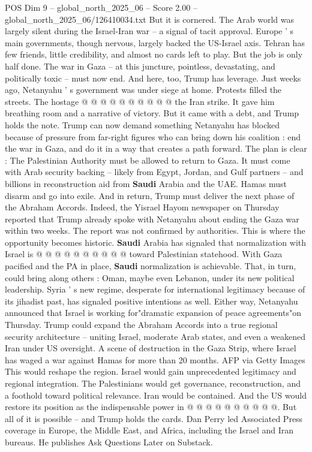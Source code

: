 \begin{textsample}{POS Dim 9 – global\_north\_2025\_06 – Score 2.00 – global\_north\_2025\_06/126410034.txt}
But it is cornered.
The Arab world was largely silent during the Israel-Iran war -- a signal of tacit approval.
Europe ' s main governments, though nervous, largely backed the US-Israel axis.
Tehran has few friends, little credibility, and almost no cards left to play.
But the job is only half done.
The war in Gaza -- at this juncture, pointless, devastating, and politically toxic -- must now end.
And here, too, Trump has leverage.
Just weeks ago, Netanyahu ' s government was under siege at home.
Protests filled the streets.
The hostage @ @ @ @ @ @ @ @ @ @ the Iran strike.
It gave him breathing room and a narrative of victory.
But it came with a debt, and Trump holds the note.
Trump can now demand something Netanyahu has blocked because of pressure from far-right figures who can bring down his coalition : end the war in Gaza, and do it in a way that creates a path forward.
The plan is clear : The Palestinian Authority must be allowed to return to Gaza.
It must come with Arab security backing -- likely from Egypt, Jordan, and Gulf partners -- and billions in reconstruction aid from \textbf{Saudi} Arabia and the UAE.
Hamas must disarm and go into exile.
And in return, Trump must deliver the next phase of the Abraham Accords.
Indeed, the Yisrael Hayom newspaper on Thursday reported that Trump already spoke with Netanyahu about ending the Gaza war within two weeks.
The report was not confirmed by authorities.
This is where the opportunity becomes historic. \textbf{Saudi} Arabia has signaled that normalization with Israel is @ @ @ @ @ @ @ @ @ @ toward Palestinian statehood.
With Gaza pacified and the PA in place, \textbf{Saudi} normalization is achievable.
That, in turn, could bring along others : Oman, maybe even Lebanon, under its new political leadership.
Syria ' s new regime, desperate for international legitimacy because of its jihadist past, has signaled positive intentions as well.
Either way, Netanyahu announced that Israel is working for"dramatic expansion of peace agreements"on Thursday.
Trump could expand the Abraham Accords into a true regional security architecture -- uniting Israel, moderate Arab states, and even a weakened Iran under US oversight.
A scene of destruction in the Gaza Strip, where Israel has waged a war against Hamas for more than 20 months.
AFP via Getty Images This would reshape the region.
Israel would gain unprecedented legitimacy and regional integration.
The Palestinians would get governance, reconstruction, and a foothold toward political relevance.
Iran would be contained.
And the US would restore its position as the indispensable power in @ @ @ @ @ @ @ @ @ @.
But all of it is possible -- and Trump holds the cards.
Dan Perry led Associated Press coverage in Europe, the Middle East, and Africa, including the Israel and Iran bureaus.
He publishes Ask Questions Later on Substack.

\end{textsample}
